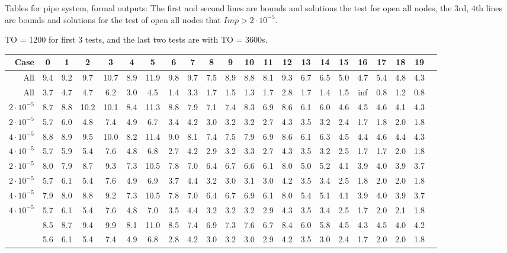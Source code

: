 \clearpage

Tables for pipe system, formal outputs: The first and second lines are bounds and solutions the test for open all nodes, the 3rd, 4th lines are bounds and solutions for the test of open all nodes that $Imp > 2\cdot10^{-5}$.

TO = 1200 for first 3 tests, and the last two tests are with TO = 3600s.



\begin{table}
	\begin{tabular}{|r||c|c|c|c|c|c|c|c|c|c|c|c|c|c|c|c|c|c|c|c|c|}
		\hline
	Case& 0 & 1 & 2 & 3 & 4 & 5 & 6 & 7 & 8 & 9 & 10 & 11 & 12 & 13 & 14 & 15 & 16 & 17 & 18 & 19 \\\hline\hline
All & 9.4 &9.2 &9.7 &10.7 &8.9 &11.9 &9.8 &9.7 &7.5 &8.9 &8.8 &8.1 &9.3 &6.7 &6.5 &5.0 &4.7 &5.4 &4.8 &4.3  \\\hline
All & 3.7 &4.7 &4.7 &6.2 &3.0 &4.5 &1.4 &3.3 &1.7 &1.5 &1.3 &1.7 &2.8 &1.7 &1.4 &1.5 &inf &0.8 &1.2 &0.8  \\\hline\hline

$2\cdot10^{-5}$&8.7 &8.8 &10.2 &10.1 &8.4 &11.3 &8.8 &7.9 &7.1 &7.4 &8.3 &6.9 &8.6 &6.1 &6.0 &4.6 &4.5 &4.6 &4.1 &4.3  \\\hline
$2\cdot10^{-5}$&5.7 &6.0 &4.8 &7.4 &4.9 &6.7 &3.4 &4.2 &3.0 &3.2 &3.2 &2.7 &4.3 &3.5 &3.2 &2.4 &1.7 &1.8 &2.0 &1.8  \\\hline\hline

$4\cdot10^{-5}$&8.8 &8.9 &9.5 &10.0 &8.2 &11.4 &9.0 &8.1 &7.4 &7.5 &7.9 &6.9 &8.6 &6.1 &6.3 &4.5 &4.4 &4.6 &4.4 &4.3  \\\hline
$4\cdot10^{-5}$&5.7 &5.9 &5.4 &7.6 &4.8 &6.8 &2.7 &4.2 &2.9 &3.2 &3.3 &2.7 &4.3 &3.5 &3.2 &2.5 &1.7 &1.7 &2.0 &1.8  \\\hline\hline

$2\cdot10^{-5}$&8.0 &7.9 &8.7 &9.3 &7.3 &10.5 &7.8 &7.0 &6.4 &6.7 &6.6 &6.1 &8.0 &5.0 &5.2 &4.1 &3.9 &4.0 &3.9 &3.7  \\\hline
$2\cdot10^{-5}$&5.7 &6.1 &5.4 &7.6 &4.9 &6.9 &3.7 &4.4 &3.2 &3.0 &3.1 &3.0 &4.2 &3.5 &3.4 &2.5 &1.8 &2.0 &2.0 &1.8  \\\hline\hline

$4\cdot10^{-5}$&7.9 &8.0 &8.8 &9.2 &7.3 &10.5 &7.8 &7.0 &6.4 &6.7 &6.9 &6.1 &8.0 &5.4 &5.1 &4.1 &3.9 &4.0 &3.9 &3.7  \\\hline
$4\cdot10^{-5}$&5.7 &6.1 &5.4 &7.6 &4.8 &7.0 &3.5 &4.4 &3.2 &3.2 &3.2 &2.9 &4.3 &3.5 &3.4 &2.5 &1.7 &2.0 &2.1 &1.8  \\\hline

&8.5 &8.7 &9.4 &9.9 &8.1 &11.0 &8.5 &7.4 &6.9 &7.3 &7.6 &6.7 &8.4 &6.0 &5.8 &4.5 &4.3 &4.5 &4.0 &4.2  \\\hline
&5.6 &6.1 &5.4 &7.4 &4.9 &6.8 &2.8 &4.2 &3.0 &3.2 &3.0 &2.9 &4.2 &3.5 &3.0 &2.4 &1.7 &2.0 &2.0 &1.8  \\\hline
	\end{tabular}
	
	

	
\end{table}